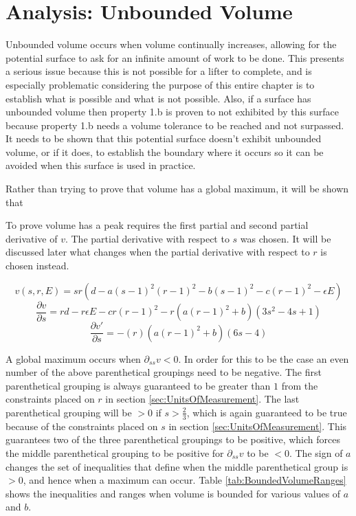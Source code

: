 \section{Analysis: Unbounded Volume}
\label{sec:PotentialSurfaceUnboundedVolume}

Unbounded volume occurs when volume continually increases, allowing for the potential surface to ask for an infinite amount of work to be done. This presents a serious issue because this is not possible for a lifter to complete, and is especially problematic considering the purpose of this entire chapter is to establish what is possible and what is not possible. Also, if a surface has unbounded volume then property 1.b is proven to not exhibited by this surface because property 1.b needs a volume tolerance to be reached and not surpassed. It needs to be shown that this potential surface doesn't exhibit unbounded volume, or if it does, to establish the boundary where it occurs so it can be avoided when this surface is used in practice.

Rather than trying to prove that volume has a global maximum, it will be shown that 

To prove volume has a peak requires the first partial and second partial derivative of $v$. The partial derivative with respect to $s$ was chosen. It will be discussed later what changes when the partial derivative with respect to $r$ is chosen instead.

\begin{equation}
    \label{eq:_IntensitySubedInVolume}
    v(s,r,E)=sr\left( d-a(s-1)^2(r-1)^2-b(s-1)^2-c(r-1)^2-\epsilon E \right)
\end{equation}
\begin{equation}
    \label{eq:VolumeSPartialDerivative}
    \frac{\partial v}{\partial s}=rd-r\epsilon E-cr(r-1)^2-r\left( a(r-1)^2+b \right)\left( 3s^2-4s+1 \right)
\end{equation}
\begin{equation}
    \label{eq:VolumeSSecondPartialDerivative}
    \frac{\partial v'}{\partial s}=-(r)\left( a(r-1)^2+b \right)(6s-4)
\end{equation}

A global maximum occurs when $\partial_{ss} v<0$. In order for this to be the case an even number of the above parenthetical groupings need to be negative. The first parenthetical grouping is always guaranteed to be greater than $1$ from the constraints placed on $r$ in section \ref{sec:UnitsOfMeasurement}. The last parenthetical grouping will be $>0$ if $s>\frac{2}{3}$, which is again guaranteed to be true because of the constraints placed on $s$ in section \ref{sec:UnitsOfMeasurement}. This guarantees two of the three parenthetical groupings to be positive, which forces the middle parenthetical grouping to be positive for $\partial_{ss} v$ to be $<0$. The sign of $a$ changes the set of inequalities that define when the middle parenthetical group is $>0$, and hence when a maximum can occur. Table \ref{tab:BoundedVolumeRanges} shows the inequalities and ranges when volume is bounded for various values of $a$ and $b$.

